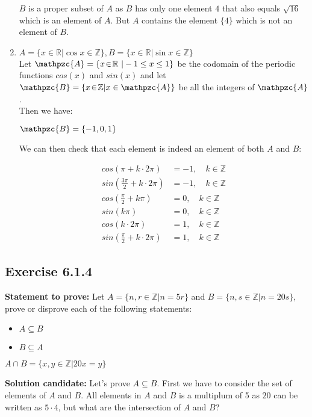 \documentclass{report}
\newcommand{\cent}[1]{\begin{center}#1\end{center}}
\newcommand{\mAlign}[1]{\begin{align*}#1\end{align*}}
\newcommand{\doubleR}{\mathbb{R}}
\newcommand{\doubleZ}{\mathbb{Z}}
\newcommand{\In}{\! \in \!}
\newcommand{\script}[1]{\mathpzc{#1}}
\newcommand{\Prove}{\textbf{Statement to prove: }}
\newcommand{\solution}{\textbf{Solution candidate: }}
\newcommand{\QED}{\boxed{}}
\newcommand{\Exercise}[1]{\subsection{Exercise #1}}
\begin{document}
\begin{enumerate}[label = \textbf{a.}]
		$B$ is a proper subset of $A$ as $B$ has only one element $4$ that also equals $\sqrt{16}$ which is an element of $A$. But $A$ contains the element $\{4\}$ which is not an element of $B$.
		
		\item $A = \{x \In \doubleR | \cos{x} \in \doubleZ\}, B = \{x \In \doubleR | \sin{x} \in \doubleZ\}$\\
		
		Let $\script{A} = \{x \In \doubleR\ | -1 \leq x \leq 1\}$ be the codomain of the periodic functions $cos(x)$ and $sin(x)$ and let $\script{B} = \{x \In \doubleZ | x \in \script{A}\}$ be all the integers of $\script{A}$.\\
		
		Then we have:
		
		\cent{$\script{B} = \{-1,0,1\}$}
		
		We can then check that each element is indeed an element of both $A$ and $B$:
		
		\mAlign{cos(\pi + k \cdot 2\pi) &= -1, \quad k \In \doubleZ\\
						sin(\frac{3\pi}{2} + k \cdot 2\pi) &= -1,  \quad k \In \doubleZ\\
						cos(\frac{\pi}{2} + k \pi) &= 0, \quad k \In \doubleZ\\
						sin(k\pi) &= 0, \quad k \In \doubleZ\\
						cos(k \cdot 2 \pi) &= 1,\quad k \In \doubleZ\\
						sin(\frac{\pi}{2} + k \cdot 2 \pi) &= 1,\quad k \In \doubleZ}
					
		\QED
	\end{enumerate}	
	
	\Exercise{6.1.4} 
		
	\Prove
	Let $A = \{n,r \In \doubleZ | n = 5r\}$ and $B = \{n,s \In \doubleZ | n = 20s\}$, prove or disprove each of the following statements:
	\begin{itemize}
		\item $A \subseteq B$
		\item $B \subseteq A$
	\end{itemize}

	\cent{$A \cap B = \{x,y \In \doubleZ | 20x = y\}$}
	
	\solution
	Let's prove $A \subseteq B$. First we have to consider the set of elements of $A$ and $B$. All elements in $A$ and $B$ is a multiplum of 5 as $20$ can be written as $5 \cdot 4$, but what are the intersection of $A$ and $B$?\\
	
\end{document}
